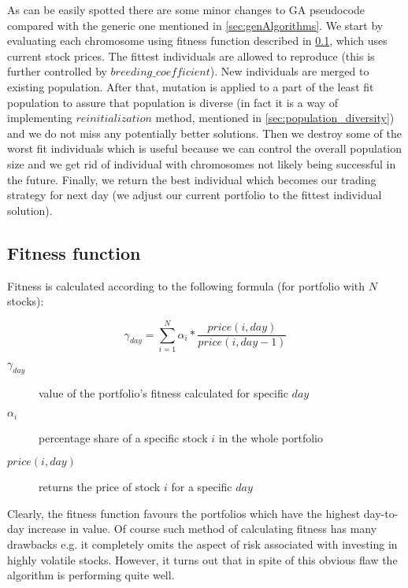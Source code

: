 As can be easily spotted there are some minor changes to GA pseudocode compared with the generic one mentioned in \ref{sec:genAlgorithms}.
We start by evaluating each chromosome using fitness function described in \ref{sec:gen_fitness_fun}, which uses current stock prices.
The fittest individuals are allowed to reproduce (this is further controlled by $breeding\_coefficient$).
New individuals are merged to existing population.
After that, mutation is applied to a part of the least fit population to assure that population is diverse (in fact it is a way of implementing $reinitialization$
method, mentioned in \ref{sec:population_diversity}) and we do not miss any potentially better solutions.
Then we destroy some of the worst fit individuals which is useful because we can control the overall population size and we get rid of individual with chromosomes
not likely being successful in the future.
Finally, we return the best individual which becomes our trading strategy for next day (we adjust our current portfolio to the fittest individual solution). 


\subsection{Fitness function}
\label{sec:gen_fitness_fun}

Fitness is calculated according to the following formula (for portfolio with $N$ stocks):

\begin{equation}
    \gamma_{day} =  \sum_{i=1}^{N} {  \alpha_{i} * \frac{price(i,day)}{price(i,day - 1)} }
\end{equation}

\begin{description}
  \item [$\gamma_{day}$] 
      value of the portfolio's fitness calculated for specific $day$
  \item [$\alpha_{i}$]
      percentage share of a specific stock $i$ in the whole portfolio
  \item [$price(i,day)$]
      returns the price of stock $i$ for a specific $day$
\end{description}

Clearly, the fitness function favours the portfolios which have the highest day-to-day increase in value.
Of course such method of calculating fitness has many drawbacks e.g. it completely omits the aspect of risk associated with investing in highly volatile stocks.
However, it turns out that in spite of this obvious flaw the algorithm is performing quite well.  


